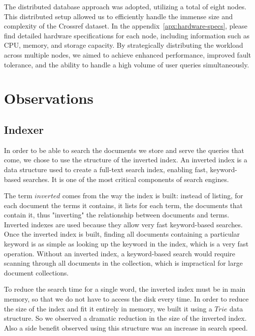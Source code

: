 \documentclass{article}
\begin{document}
The distributed database approach was adopted, utilizing a total of eight nodes. 
This distributed setup allowed us to efficiently handle the immense size and complexity of the 
Crossref dataset. In the appendix~\ref{apx:hardware-specs}, please find detailed hardware 
specifications for each node, including information such as CPU, memory, and storage capacity. 
By strategically distributing the workload across multiple nodes, we aimed to achieve enhanced 
performance, improved fault tolerance, and the ability to handle a high volume of user queries 
simultaneously. 

\section{Observations}

\subsection{Indexer}
In order to be able to search the documents we store and serve the queries that come, we chose 
to use the structure of the inverted index. An inverted index is a data structure used to create 
a full-text search index, enabling fast, keyword-based searches. It is one of the most critical 
components of search engines.

The term $inverted$ comes from the way the index is built: instead of listing, for each document 
the terms it contains, it lists for each term, the documents that contain it, thus "inverting" 
the relationship between documents and terms. Inverted indexes are used because they allow very 
fast keyword-based searches. Once the inverted index is built, finding all documents containing 
a particular keyword is as simple as looking up the keyword in the index, which is a very fast 
operation. Without an inverted index, a keyword-based search would require scanning through all 
documents in the collection, which is impractical for large document collections.

To reduce the search time for a single word, the inverted index must be in main memory, so that 
we do not have to access the disk every time. In order to reduce the size of the index and fit it 
entirely in memory, we built it using a $Trie$ data structure. So we observed a dramatic reduction 
in the size of the inverted index. Also a side benefit observed using this structure was an 
increase in search speed.
\end{document}
